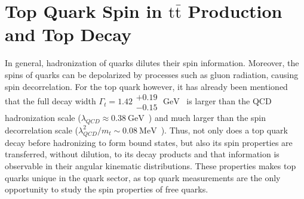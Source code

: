 \section{Top Quark Spin in \ensuremath{\mathrm{t\bar{t}}} Production and Top Decay}
\label{Top_Quark_Spin_in_ttbar_Production_and_Top_Decay}
In general, hadronization of quarks dilutes their spin information.
Moreover, the spins of quarks can be depolarized by processes such as gluon radiation, causing spin decorrelation.
For the top quark however, it has already been mentioned that the full decay width $\Gamma_t = 1.42 \substack{+0.19 \\ -0.15} \; \si{\GeV}$~\cite{bib:PDG} is larger than the QCD hadronization scale ($\lambda_{QCD} \approx \SI{0.38}{\GeV}$~\cite{Groote_1998}) and much larger than the spin decorrelation scale ($\lambda_{QCD}^2/m_t \sim \SI{0.08}{\MeV}$~\cite{Stelzer_1996}).
Thus, not only does a top quark decay before hadronizing to form bound states, but also its spin properties are transferred, without dilution, to its decay products and that information is observable in their angular kinematic distributions.
These properties makes top quarks unique in the quark sector, as top quark measurements are the only opportunity to study the spin properties of free quarks.

